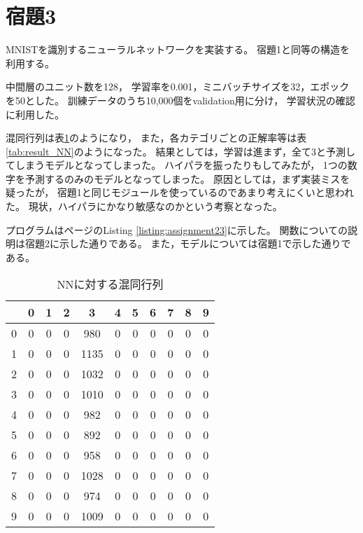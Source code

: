 \documentclass[class=jsarticle, crop=false, dvipdfmx, fleqn]{standalone}
\begin{document}
\section*{宿題3}

MNISTを識別するニューラルネットワークを実装する。
宿題1と同等の構造を利用する。

中間層のユニット数を128，
学習率を0.001，ミニバッチサイズを32，エポックを50とした。
訓練データのうち10,000個をvalidation用に分け，
学習状況の確認に利用した。

混同行列は表\ref{tab:confusion_matrix_NN}のようになり，
また，各カテゴリごとの正解率等は表\ref{tab:result_NN}のようになった。
結果としては，学習は進まず，全て3と予測してしまうモデルとなってしまった。
ハイパラを振ったりもしてみたが，
1つの数字を予測するのみのモデルとなってしまった。
原因としては，まず実装ミスを疑ったが，
宿題1と同じモジュールを使っているのであまり考えにくいと思われた。
現状，ハイパラにかなり敏感なのかという考察となった。

プログラムは\pageref{listing:assignment23}ページのListing \ref{listing:assignment23}に示した。
関数についての説明は宿題2に示した通りである。
また，モデルについては宿題1で示した通りである。

\begin{table}[H]
	\centering
	\caption{NNに対する混同行列}
	\begin{tabular}{|c||cccccccccc|} \hline
			& 0 & 1 & 2 & 3 & 4 & 5 & 6 & 7 & 8 & 9 \\ \hline\hline
        0     & 0 & 0 & 0 & 980 & 0 & 0 & 0 & 0 & 0 & 0 \\
        1     & 0 & 0 & 0 & 1135 & 0 & 0 & 0 & 0 & 0 & 0 \\
        2     & 0 & 0 & 0 & 1032 & 0 & 0 & 0 & 0 & 0 & 0 \\
        3     & 0 & 0 & 0 & 1010 & 0 & 0 & 0 & 0 & 0 & 0 \\
        4     & 0 & 0 & 0 & 982 & 0 & 0 & 0 & 0 & 0 & 0 \\
        5     & 0 & 0 & 0 & 892 & 0 & 0 & 0 & 0 & 0 & 0 \\
        6     & 0 & 0 & 0 & 958 & 0 & 0 & 0 & 0 & 0 & 0 \\
        7     & 0 & 0 & 0 & 1028 & 0 & 0 & 0 & 0 & 0 & 0 \\
        8     & 0 & 0 & 0 & 974 & 0 & 0 & 0 & 0 & 0 & 0 \\
        9     & 0 & 0 & 0 & 1009 & 0 & 0 & 0 & 0 & 0 & 0 \\
		\hline
	\end{tabular}
	\label{tab:confusion_matrix_NN}
\end{table}
\end{document}
